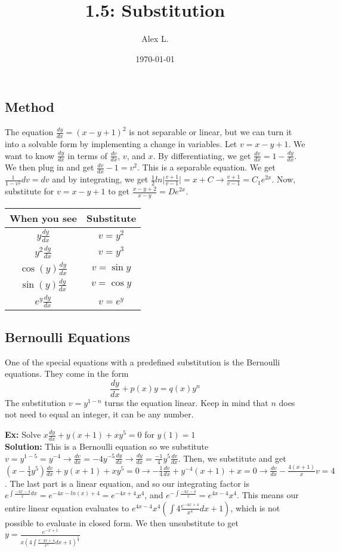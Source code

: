 \documentclass{article}
\title{1.5: Substitution}
\author{Alex L.}
\date{\today}
\begin{document}
\maketitle

\subsection{Method}

The equation $\frac{dy}{dx} = (x-y+1)^2$ is not separable or linear, but we can turn it into a solvable form by implementing a change in variables. Let $v = x-y+1$. We want to know $\frac{dy}{dx}$ in terms of $\frac{dv}{dx}$, $v$, and $x$. By differentiating, we get $\frac{dv}{dx} = 1 - \frac{dy}{dx}$. We then plug in and get $\frac{dv}{dx} - 1 = v^2$. This is a separable equation. We get $\frac{1}{1-v^2} dv = dv$ and by integrating, we get $\frac{1}{2} ln\vert \frac{v+1}{v-1} \vert = x+C \rightarrow \frac{v+1}{v-1} = C_1e^{2x}$. Now, substitute for $v = x-y+1$ to get $\frac{x-y+2}{x-y} = De^{2x}$.

\renewcommand{\arraystretch}{1.5}
\begin{tabular}{c|c}
    When you see & Substitute\\
    \hline
    $y \frac{dy}{dx}$ & $v=y^2$\\
    $y^2 \frac{dy}{dx}$ & $v=y^3$\\
    $\cos (y) \frac{dy}{dx}$ & $v=\sin y$\\
    $\sin (y) \frac{dy}{dx}$ & $v = \cos y$\\
    $e^y \frac{dy}{dx}$ & $v = e^y$ 
\end{tabular}

\subsection{Bernoulli Equations}

One of the special equations with a predefined substitution is the Bernoulli equations. They come in the form $$\frac{dy}{dx} + p(x)y = q(x)y^n$$The substitution $v = y^{1-n}$ turns the equation linear. Keep in mind that $n$ does not need to equal an integer, it can be any number.

\textbf{Ex:} Solve $x \frac{dy}{dx} + y(x+1) + xy^5 = 0$ for $y(1) = 1$ \\ \textbf{Solution:} This is a Bernoulli equation so we substitute $v = y^{1-5} = y^{-4} \rightarrow \frac{dv}{dx} = -4y^{-5} \frac{dy}{dx} \rightarrow \frac{dy}{dx} = \frac{-1}{4}y^5 \frac{dv}{dx}$. Then, we substitute and get $(x-\frac{1}{4}y^5)\frac{dv}{dx} + y(x+1) + xy^5 = 0 \rightarrow -\frac{1}{4}\frac{dv}{dx} + y^{-4}(x+1) + x = 0 \rightarrow \frac{dv}{dx} - \frac{4(x+1)}{x}v = 4$. The last part is a linear equation, and so our integrating factor is $e^{\int \frac{-4x-4}{x} dx} = e^{-4x-ln(x)+4} = e^{-4x+4}{x^4}$, and $e^{-\int \frac{-4x-4}{x}} = e^{4x-4}x^4$. This means our entire linear equation evaluates to $e^{4x-4}x^4(\int 4\frac{e^{-4x+4}}{x^4}dx + 1)$, which is not possible to evaluate in closed form. We then unsubstitute to get $y = \frac{e^{-x+1}}{x(4\int \frac{e^-4x+4}{x^4}dx+1)^{\frac{1}{4}}}$
\end{document}
